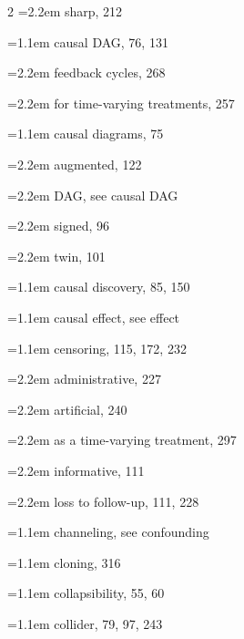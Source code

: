 \begin{multicols}{2}
\hspace*{1.1em}\hangindent=2.2em sharp, 212\par
\hangindent=1.1em causal DAG, 76, 131\par
\hspace*{1.1em}\hangindent=2.2em feedback cycles, 268\par
\hspace*{1.1em}\hangindent=2.2em for time-varying treatments, 257\par
\hangindent=1.1em causal diagrams, 75\par
\hspace*{1.1em}\hangindent=2.2em augmented, 122\par
\hspace*{1.1em}\hangindent=2.2em DAG, see causal DAG\par
\hspace*{1.1em}\hangindent=2.2em signed, 96\par
\hspace*{1.1em}\hangindent=2.2em twin, 101\par
\hangindent=1.1em causal discovery, 85, 150\par
\hangindent=1.1em causal effect, see effect\par
\hangindent=1.1em censoring, 115, 172, 232\par
\hspace*{1.1em}\hangindent=2.2em administrative, 227\par
\hspace*{1.1em}\hangindent=2.2em artificial, 240\par
\hspace*{1.1em}\hangindent=2.2em as a time-varying treatment, 297\par
\hspace*{1.1em}\hangindent=2.2em informative, 111\par
\hspace*{1.1em}\hangindent=2.2em loss to follow-up, 111, 228\par
\hangindent=1.1em channeling, see confounding\par
\hangindent=1.1em cloning, 316\par
\hangindent=1.1em collapsibility, 55, 60\par
\hangindent=1.1em collider, 79, 97, 243\par

\end{multicols}
